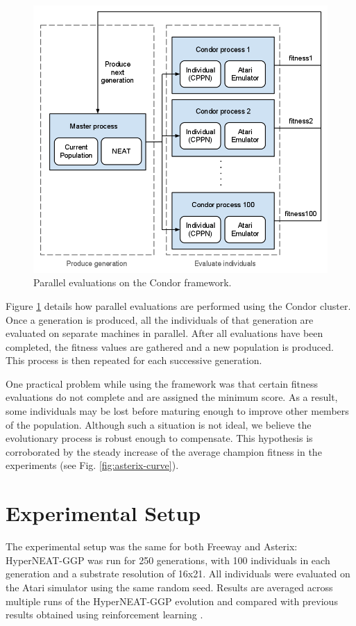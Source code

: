 \documentclass{acm_proc_article-sp}
\begin{document}
\begin{figure}[ht]
\begin{center}
\includegraphics[width=\columnwidth]{figures/condor-hyperneat-small.png}
\end{center}
\caption{Parallel evaluations on the Condor framework.}
\label{fig:condor}
\end{figure}

Figure \ref{fig:condor} details how parallel evaluations are performed using the Condor cluster. Once a generation is produced, all the individuals of that generation are evaluated on separate machines in parallel. After all evaluations have been completed, the fitness values are gathered and a new population is produced. This process is then repeated for each successive generation. 

One practical problem while using the framework was that certain fitness evaluations do not complete and are assigned the minimum score. As a result, some individuals may be lost before maturing enough to improve other members of the population. Although such a situation is not ideal, we believe the evolutionary process is robust enough to compensate. This hypothesis is corroborated by the steady increase of the average champion fitness in the experiments (see Fig. \ref{fig:asterix-curve}). 

\section{Experimental Setup}
\label{sec:experiments}
The experimental setup was the same for both Freeway and Asterix: HyperNEAT-GGP was run for 250 generations, with 100 individuals in each generation and a substrate resolution of 16x21. All individuals were evaluated on the Atari simulator using the same random seed. Results are averaged across multiple runs of the HyperNEAT-GGP evolution and compared with previous results obtained using reinforcement learning \cite{naddaf10}. 
\end{document}
